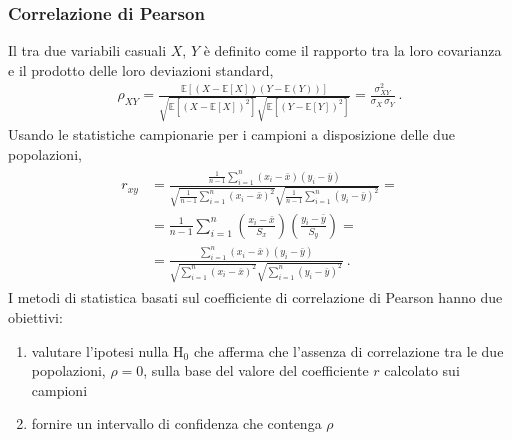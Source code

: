 \documentclass[letterpaper,10pt,italian]{jupyterBook}
\begin{document}
\subsubsection{Correlazione di Pearson}
\label{\detokenize{ch/statistics/hp-test-correlation:correlazione-di-pearson}}
\sphinxAtStartPar
Il  tra due variabili casuali \(X\), \(Y\) è definito come il rapporto tra la loro covarianza e il prodotto delle loro deviazioni standard,
\begin{equation*}
\begin{split}\rho_{XY} = \frac{\mathbb{E}[(X-\mathbb{E}[X])(Y-\mathbb{E}(Y))]}{\sqrt{\mathbb{E}[(X-\mathbb{E}[X])^2]}\sqrt{\mathbb{E}[(Y-\mathbb{E}[Y])^2]}} = \frac{\sigma^2_{XY}}{\sigma_X \, \sigma_Y} \ .\end{split}
\end{equation*}
\sphinxAtStartPar
{} Usando le statistiche campionarie per i campioni a disposizione delle due popolazioni,
\begin{equation*}
\begin{split}\begin{aligned}
  r_{xy} 
  & = \frac{\frac{1}{n-1} \sum_{i=1}^{n} (x_i - \bar{x})(y_i - \bar{y})}{ \sqrt{\frac{1}{n-1} \sum_{i=1}^{n} (x_i - \bar{x})^2}\sqrt{ \frac{1}{n-1} \sum_{i=1}^{n} (y_i - \bar{y})^2}} = \\
  & = \frac{1}{n-1} \sum_{i=1}^n \left( \frac{x_i - \bar{x}}{S_x} \right) \left( \frac{y_i - \bar{y}}{S_y} \right) = \\
  & = \frac{ \sum_{i=1}^{n} (x_i - \bar{x})(y_i - \bar{y})}{ \sqrt{\sum_{i=1}^{n} (x_i - \bar{x})^2}\sqrt{ \sum_{i=1}^{n} (y_i - \bar{y})^2}} \ .
\end{aligned}\end{split}
\end{equation*}
\sphinxAtStartPar
{} I metodi di statistica basati sul coefficiente di correlazione di Pearson hanno due obiettivi:
\begin{enumerate}
%
\item {} 
\sphinxAtStartPar
valutare l’ipotesi nulla \(\text{H}_0\) che afferma che l’assenza di correlazione tra le due popolazioni, \(\rho = 0\), sulla base del valore del coefficiente \(r\) calcolato sui campioni

\item {} 
\sphinxAtStartPar
fornire un intervallo di confidenza che contenga \(\rho\)

\end{enumerate}
\end{document}
